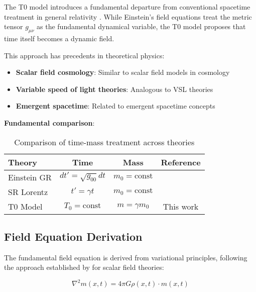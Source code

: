 \documentclass[12pt,a4paper]{article}
\begin{document}
	The T0 model introduces a fundamental departure from conventional spacetime treatment in general relativity \citep{einstein1915,misner1973,weinberg1972}. While Einstein's field equations treat the metric tensor $g_{\mu\nu}$ as the fundamental dynamical variable, the T0 model proposes that time itself becomes a dynamic field.
	
	This approach has precedents in theoretical physics:
	\begin{itemize}
		\item \textbf{Scalar field cosmology}: Similar to scalar field models in cosmology \citep{weinberg2008,peebles1993}
		\item \textbf{Variable speed of light theories}: Analogous to VSL theories \citep{barrow1999,albrecht1999}
		\item \textbf{Emergent spacetime}: Related to emergent spacetime concepts \citep{jacobson1995,verlinde2011}
	\end{itemize}
	
	\textbf{Fundamental comparison}:
	\begin{table}[htbp]
		\centering
		\begin{tabular}{|l|c|c|c|}
			\hline
			\textbf{Theory} & \textbf{Time} & \textbf{Mass} & \textbf{Reference} \\
			\hline
			Einstein GR & $dt' = \sqrt{g_{00}} dt$ & $m_0 = \text{const}$ & \citep{einstein1915,misner1973} \\
			SR Lorentz & $t' = \gamma t$ & $m_0 = \text{const}$ & \citep{einstein1905,jackson1998} \\
			T0 Model & $T_0 = \text{const}$ & $m = \gamma m_0$ & This work \\
			\hline
		\end{tabular}
		\caption{Comparison of time-mass treatment across theories}
		\label{tab:theory_comparison}
	\end{table}
	
	\subsection{Field Equation Derivation}
	\label{subsec:field_equation_derivation}
	
	The fundamental field equation is derived from variational principles, following the approach established by \citet{weinberg1995} for scalar field theories:
	
	\begin{equation}
		\label{eq:field_equation_fundamental}
		\nabla^2 m(x,t) = 4\pi G \rho(x,t) \cdot m(x,t)
	\end{equation}
	
\end{document}
